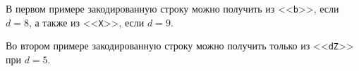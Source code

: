 В первом примере закодированную строку можно получить из <<\texttt{b}>>, если $d = 8$, а также из <<\texttt{X}>>, если $d = 9$.

Во втором примере закодированную строку можно получить только из <<\texttt{dZ}>> при $d = 5$.